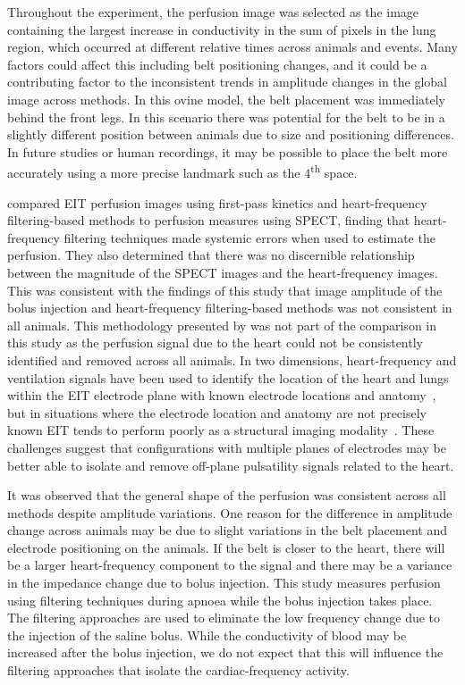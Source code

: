 Throughout the experiment, 
the perfusion image was selected as the image containing 
the largest increase in conductivity in the sum of pixels 
in the lung region, which occurred 
at different relative times across animals and events. Many factors could affect this
including belt positioning changes, and it could be a contributing factor 
to the inconsistent trends in amplitude changes in the global image across 
methods. In this ovine model, the belt placement was immediately behind the front legs. 
In this scenario there was potential for the belt to be in a slightly different 
position between animals due to size and positioning differences.
In future studies or human recordings, it may be possible to 
place the belt more accurately using a more precise landmark such as the 4\textsuperscript{th}
space. 

compared EIT perfusion images using first-pass kinetics and 
heart-frequency filtering-based methods to perfusion measures using SPECT,
finding that heart-frequency filtering
techniques made systemic errors when used to estimate the perfusion. They also 
determined that there was no discernible relationship between the magnitude of the
SPECT images and the heart-frequency images.
This was consistent with the findings of this study that image amplitude of the bolus injection and 
heart-frequency filtering-based methods was not consistent in all animals.
This methodology presented by 
was not part of the comparison in this study as the 
perfusion signal due to the heart could not be consistently
identified and removed across all animals.
In two dimensions, heart-frequency and ventilation signals 
have been used to identify the location 
of the heart and lungs within the EIT electrode plane with known electrode 
locations and anatomy~\parencite{ferrario_toward_2012}, but in situations where the electrode 
location and anatomy are not precisely known EIT tends to perform poorly as a structural 
imaging modality~\parencite{adler_electrical_2017}.
These challenges suggest that configurations with multiple planes of electrodes 
may be better able to isolate and remove off-plane 
pulsatility signals related to the heart.

It was observed that the general shape of 
the perfusion was consistent across all methods despite amplitude variations. 
One reason for the difference in amplitude change across animals may be due 
to slight variations in the belt placement and electrode positioning on the animals.
If the belt is closer to the heart, there will be a larger heart-frequency component 
to the signal and there may be a variance in the impedance change due to bolus injection.
This study measures perfusion using filtering techniques during apnoea while the bolus 
injection takes place. The filtering approaches are used to eliminate the low frequency 
change due to the injection of the saline bolus. While the conductivity of blood may be 
increased after the bolus injection, we do not expect that this will influence the filtering 
approaches that isolate the cardiac-frequency activity.

